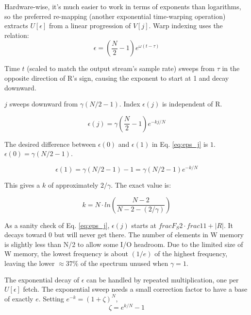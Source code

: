 Hardware-wise, it's much easier to work in terms of exponents than logarithms,
so the preferred re-mapping (another exponential time-warping operation)
extracts $U[\epsilon]$ from a linear progression of $V[j]$.
Warp indexing uses the relation:
\begin{equation}
\epsilon = \left(\frac{N}{2}-1\right) e^{\omega(t - \tau)}
\end{equation}

Time $t$ (scaled to match the output stream's sample rate) sweeps from $\tau$
in the opposite direction of R's sign,
causing the exponent to start at 1 and decay downward.

$j$ sweeps downward from $\gamma(N/2-1)$.
Index $\epsilon(j)$ is independent of R.

\begin{equation}  \label{eq:eps_j}
\epsilon(j) = \gamma \left(\frac{N}{2}-1\right) e^{-kj/N}
\end{equation}

The desired difference between $\epsilon(0)$ and $\epsilon(1)$ in
Eq. \ref{eq:eps_j} is $1$. $\epsilon(0) = \gamma(N/2 - 1)$.

\begin{equation}
\epsilon(1) = \gamma(N/2 - 1) - 1 = \gamma(N/2 - 1) e^{-k/N}
\end{equation}

This gives a $k$ of approximately $2/\gamma$. The exact value is:

\begin{equation}
k = N \cdot ln \left( \frac{N-2}{N-2-(2/\gamma)} \right)
\end{equation}

As a sanity check of Eq. \ref{eq:eps_j}, $\epsilon(j)$ starts at
$frac{F_S}{2} \cdot frac{1}{1 + |R|}$.
It decays toward 0 but will never get there.
The number of elements in W memory is slightly less than N/2 to allow some I/O
headroom. Due to the limited size of W memory,
the lowest frequency is about $(1/e)$ of the highest frequency,
leaving the lower $\approx37$\% of the spectrum unused when $\gamma=1$.

The exponential decay of $\epsilon$ can be handled by repeated multiplication,
one per $U[\epsilon]$ fetch.
The exponential sweep needs a small correction factor to have a base of exactly
$e$.
Setting $e^{-k} = (1 + \zeta)^{N}$,
\begin{equation}
\zeta = e^{k/N} - 1
\end{equation}

